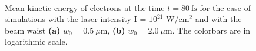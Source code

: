 \begin{figure}[h!]
	\centering
	\\[2mm]
	\caption{Mean kinetic energy of electrons at the time $ t = 80 \ \mathrm{fs} $ for the case of simulations with the laser intensity I = $ 10^{21} $ W/cm$^2$ and with the beam waist \textbf{(a)} $ w_0 = 0.5 \ \mu\mathrm{m} $, \textbf{(b)} $ w_0 = 2.0 \ \mu\mathrm{m} $. The colorbars are in logarithmic scale.}
	\label{fig:17}
\end{figure}

